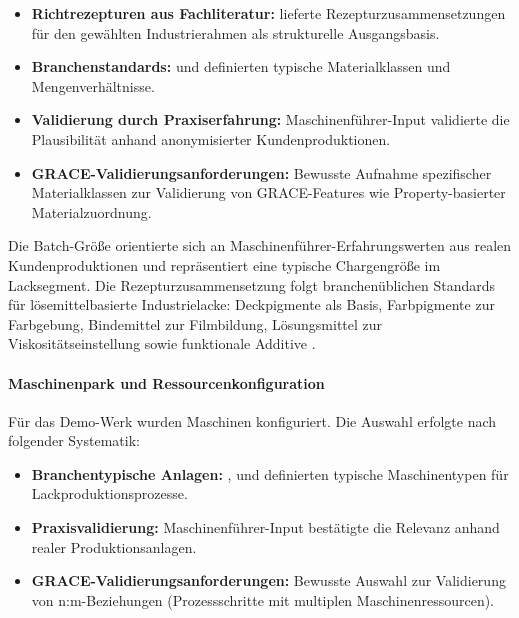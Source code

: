 \begin{itemize}
    \item \textbf{Richtrezepturen aus Fachliteratur:} \cite{mueller:lackformulierung2017} lieferte Rezepturzusammensetzungen für den gewählten Industrierahmen als strukturelle Ausgangsbasis.
    \item \textbf{Branchenstandards:} \cite{vci:lacke_farben2018} und \cite{basf:lackiertechnik2019} definierten typische Materialklassen und Mengenverhältnisse.
    \item \textbf{Validierung durch Praxiserfahrung:} Maschinenführer-Input validierte die Plausibilität anhand anonymisierter Kundenproduktionen.
    \item \textbf{GRACE-Validierungsanforderungen:} Bewusste Aufnahme spezifischer Materialklassen zur Validierung von GRACE-Features wie Property-basierter Materialzuordnung.
\end{itemize}

Die Batch-Größe orientierte sich an Maschinenführer-Erfahrungswerten aus realen Kundenproduktionen und repräsentiert eine typische Chargengröße im Lacksegment. Die Rezepturzusammensetzung folgt branchenüblichen Standards für lösemittelbasierte Industrielacke: Deckpigmente als Basis, Farbpigmente zur Farbgebung, Bindemittel zur Filmbildung, Lösungsmittel zur Viskositätseinstellung sowie funktionale Additive \citep{vci:lacke_farben2018, mueller:lackformulierung2017}.

\paragraph{Maschinenpark und Ressourcenkonfiguration}

Für das Demo-Werk wurden Maschinen konfiguriert. Die Auswahl erfolgte nach folgender Systematik:

\begin{itemize}
    \item \textbf{Branchentypische Anlagen:} \cite{vci:lacke_farben2018}, \cite{brock:lacktechnologie2020} und \cite{basf:lackiertechnik2019} definierten typische Maschinentypen für Lackproduktionsprozesse.
    \item \textbf{Praxisvalidierung:} Maschinenführer-Input bestätigte die Relevanz anhand realer Produktionsanlagen.
    \item \textbf{GRACE-Validierungsanforderungen:} Bewusste Auswahl zur Validierung von n:m-Beziehungen (Prozessschritte mit multiplen Maschinenressourcen).
\end{itemize}


